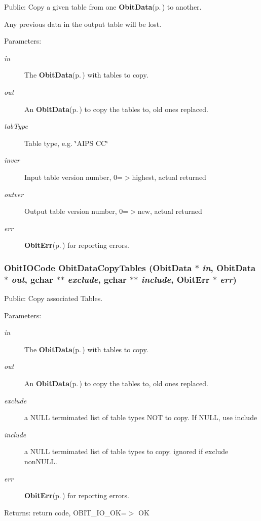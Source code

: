 Public: Copy a given table from one {\bf Obit\-Data}{\rm (p.\,\pageref{structObitData})} to another. 

Any previous data in the output table will be lost. \begin{Desc}
\item[Parameters:]
\begin{description}
\item[{\em in}]The {\bf Obit\-Data}{\rm (p.\,\pageref{structObitData})} with tables to copy. \item[{\em out}]An {\bf Obit\-Data}{\rm (p.\,\pageref{structObitData})} to copy the tables to, old ones replaced. \item[{\em tab\-Type}]Table type, e.g. \char`\"{}AIPS CC\char`\"{} \item[{\em inver}]Input table version number, 0=$>$highest, actual returned \item[{\em outver}]Output table version number, 0=$>$new, actual returned \item[{\em err}]{\bf Obit\-Err}{\rm (p.\,\pageref{structObitErr})} for reporting errors. \end{description}
\end{Desc}
\subsubsection{\setlength{\rightskip}{0pt plus 5cm}Obit\-IOCode Obit\-Data\-Copy\-Tables ({\bf Obit\-Data} $\ast$ {\em in}, {\bf Obit\-Data} $\ast$ {\em out}, gchar $\ast$$\ast$ {\em exclude}, gchar $\ast$$\ast$ {\em include}, {\bf Obit\-Err} $\ast$ {\em err})}\label{ObitData_8h_a44}


Public: Copy associated Tables. 

\begin{Desc}
\item[Parameters:]
\begin{description}
\item[{\em in}]The {\bf Obit\-Data}{\rm (p.\,\pageref{structObitData})} with tables to copy. \item[{\em out}]An {\bf Obit\-Data}{\rm (p.\,\pageref{structObitData})} to copy the tables to, old ones replaced. \item[{\em exclude}]a NULL termimated list of table types NOT to copy. If NULL, use include \item[{\em include}]a NULL termimated list of table types to copy. ignored if exclude non\-NULL. \item[{\em err}]{\bf Obit\-Err}{\rm (p.\,\pageref{structObitErr})} for reporting errors. \end{description}
\end{Desc}
\begin{Desc}
\item[Returns:]return code, OBIT\_\-IO\_\-OK=$>$ OK \end{Desc}
